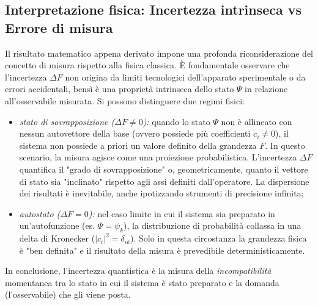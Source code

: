 \documentclass[a4paper,11pt]{report}
\begin{document}
\subsection{Interpretazione fisica: Incertezza intrinseca vs Errore di misura}
Il risultato matematico appena derivato impone una profonda riconsiderazione del concetto di misura rispetto alla fisica classica.
È fondamentale osservare che l'incertezza $\Delta F$ non origina da limiti tecnologici dell'apparato sperimentale o da errori accidentali, bensì è una proprietà intrinseca dello stato $\Psi$ in relazione all'osservabile misurata.
Si possono distinguere due regimi fisici:
\begin{itemize}
    \item \textit{stato di sovrapposizione ($\Delta F \neq 0$):}
    quando lo stato $\Psi$ non è allineato con nessun autovettore della base (ovvero possiede più coefficienti $c_i \neq 0$), il sistema non possiede a priori un valore definito della grandezza $F$.
    In questo scenario, la misura agisce come una proiezione probabilistica. L'incertezza $\Delta F$ quantifica il "grado di sovrapposizione" o, geometricamente, quanto il vettore di stato sia "inclinato" rispetto agli assi definiti dall'operatore.
    La dispersione dei risultati è inevitabile, anche ipotizzando strumenti di precisione infinita;

    \item \textit{autostato ($\Delta F = 0$):}
    nel caso limite in cui il sistema sia preparato in un'autofunzione (es. $\Psi = \psi_k$), la distribuzione di probabilità collassa in una delta di Kronecker ($|c_i|^2 = \delta_{ik}$).
    Solo in questa circostanza la grandezza fisica è "ben definita" e il risultato della misura è prevedibile deterministicamente.
\end{itemize}
In conclusione, l'incertezza quantistica è la misura della \textit{incompatibilità} momentanea tra lo stato in cui il sistema è stato preparato e la domanda (l'osservabile) che gli viene posta.
\end{document}
